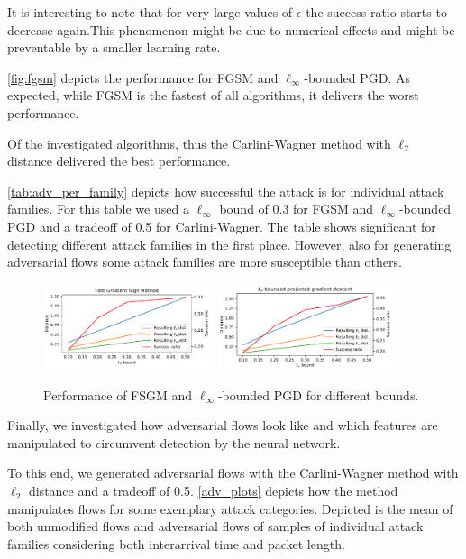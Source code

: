 \documentclass[sigconf,nonacm]{acmart}
\begin{document}
It is interesting to note that for very large values of $\epsilon$ the success ratio starts to decrease again.This phenomenon might be due to numerical effects and might be preventable by a smaller learning rate.


\autoref{fig:fgsm} depicts the performance for FGSM and $\ell_\infty$-bounded PGD. As expected, while FGSM is the fastest of all algorithms, it delivers the worst performance. 

Of the investigated algorithms, thus the Carlini-Wagner method with $\ell_2$ distance delivered the best performance.

\autoref{tab:adv_per_family} depicts how successful the attack is for individual attack families. For this table we used a $\ell_\infty$ bound of 0.3 for FGSM and $\ell_\infty$-bounded PGD and a tradeoff of 0.5 for Carlini-Wagner. The table shows significant for detecting different attack families in the first place. However, also for generating adversarial flows some attack families are more susceptible than others.

\begin{figure}
\includegraphics[width=0.45\textwidth]{adv_plots/fgsm.pdf}
\includegraphics[width=0.45\textwidth]{adv_plots/l_inf_pgd.pdf}
\caption{Performance of FSGM and $\ell_\infty$-bounded PGD for different bounds.}
\label{fig:fgsm}
\end{figure}

Finally, we investigated how adversarial flows look like and which features are manipulated to circumvent detection by the neural network.

To this end, we generated adversarial flows with the Carlini-Wagner method with $\ell_2$ distance and a tradeoff of 0.5. \autoref{adv_plots} depicts how the method manipulates flows for some exemplary attack categories. Depicted is the mean of both unmodified flows and adversarial flows  of samples of individual attack families considering both interarrival time and packet length.
\end{document}

